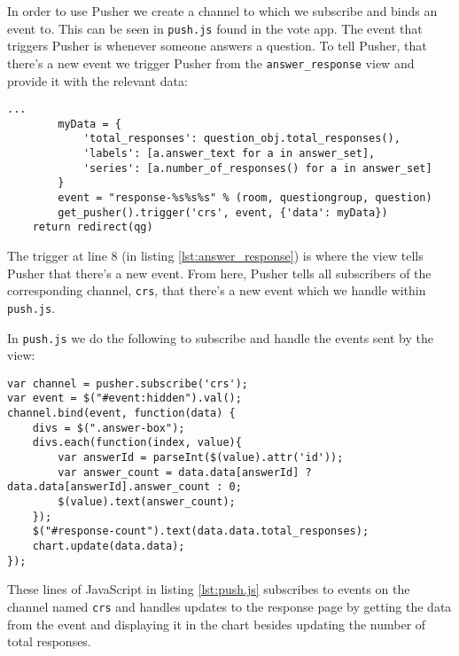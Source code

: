 In order to use Pusher we create a channel to which we subscribe and binds an event to. This can be seen in \texttt{push.js} found in the vote app. The event that triggers Pusher is whenever someone answers a question. To tell Pusher, that there's a new event we trigger Pusher from the \texttt{answer\_response} view and provide it with the relevant data:

\begin{lstlisting}[caption=Selected parts of the answer\_response view, label=lst:answer_response]
        ...
        myData = {
            'total_responses': question_obj.total_responses(),
            'labels': [a.answer_text for a in answer_set],
            'series': [a.number_of_responses() for a in answer_set]
        }
        event = "response-%s%s%s" % (room, questiongroup, question)
        get_pusher().trigger('crs', event, {'data': myData})
    return redirect(qg)
\end{lstlisting}

The trigger at line 8 (in listing \ref{lst:answer_response}) is where the view tells Pusher that there's a new event. From here, Pusher tells all subscribers of the corresponding channel, \texttt{crs}, that there's a new event which we handle within \texttt{push.js}.

In \texttt{push.js} we do the following to subscribe and handle the events sent by the view:

\begin{lstlisting}[caption=Selected parts of push.js, label=lst:push.js]
var channel = pusher.subscribe('crs');
var event = $("#event:hidden").val();
channel.bind(event, function(data) {
    divs = $(".answer-box");
    divs.each(function(index, value){
        var answerId = parseInt($(value).attr('id'));
        var answer_count = data.data[answerId] ? data.data[answerId].answer_count : 0;
        $(value).text(answer_count);
    });
    $("#response-count").text(data.data.total_responses);
    chart.update(data.data);
});
\end{lstlisting}

These lines of JavaScript in listing \ref{lst:push.js} subscribes to events on the channel named \texttt{crs} and handles updates to the response page by getting the data from the event and displaying it in the chart besides updating the number of total responses.




